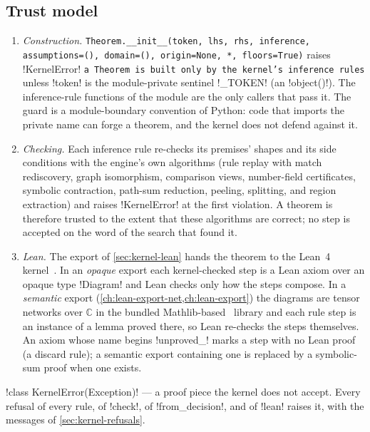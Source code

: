 \subsection{Trust model}\label{sec:kernel-trust}

\begin{enumerate}
\item \emph{Construction.} \texttt{Theorem.\allowbreak{}\_\allowbreak{}\_\allowbreak{}init\_\allowbreak{}\_\allowbreak{}(\allowbreak{}token,\allowbreak{} lhs,\allowbreak{} rhs,\allowbreak{} inference,\allowbreak{} assumptions=(\allowbreak{}),\allowbreak{} domain=(\allowbreak{}),\allowbreak{} origin=None,\allowbreak{} *,\allowbreak{} floors=True)} raises \py!KernelError! \texttt{a Theorem is built only by the kernel's inference rules} unless \code!token! is the module-private sentinel \py!_TOKEN! (an \py!object()!). The inference-rule functions of the module are the only callers that pass it. The guard is a module-boundary convention of Python: code that imports the private name can forge a theorem, and the kernel does not defend against it.
\item \emph{Checking.} Each inference rule re-checks its premises' shapes and its side conditions with the engine's own algorithms (rule replay with match rediscovery, graph isomorphism, comparison views, number-field certificates, symbolic contraction, path-sum reduction, peeling, splitting, and region extraction) and raises \py!KernelError! at the first violation. A theorem is therefore trusted to the extent that these algorithms are correct; no step is accepted on the word of the search that found it.
\item \emph{Lean.} The export of \cref{sec:kernel-lean} hands the theorem to the Lean~4 kernel~\cite{demoura2021lean4}. In an \emph{opaque} export each kernel-checked step is a Lean axiom over an opaque type \lean!Diagram! and Lean checks only how the steps compose. In a \emph{semantic} export (\cref{ch:lean-export-net,ch:lean-export}) the diagrams are tensor networks over $\mathbb{C}$ in the bundled Mathlib-based~\cite{mathlib2020} library and each rule step is an instance of a lemma proved there, so Lean re-checks the steps themselves. An axiom whose name begins \lean!unproved_! marks a step with no Lean proof (a discard rule); a semantic export containing one is replaced by a symbolic-sum proof when one exists.
\end{enumerate}

\begin{signature}
\py!class KernelError(Exception)! --- a proof piece the kernel does not accept. Every refusal of every rule, of \py!check!, of \py!from_decision!, and of \py!lean! raises it, with the messages of \cref{sec:kernel-refusals}.
\end{signature}

